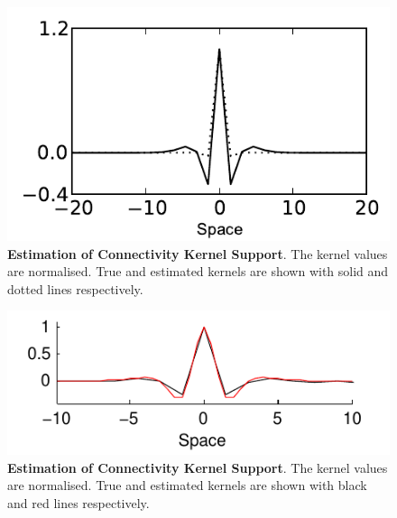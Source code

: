 \documentclass[]{article}
\begin{document}
\begin{figure}[!ht]
\begin{center}
\includegraphics{./Figures/KernelWidthEstimation.pdf}
\end{center}
\caption{{\bf Estimation of Connectivity Kernel Support}. The kernel values are normalised. True  and estimated kernels are shown with solid and dotted lines respectively.}
\label{fig:KernelWidth}
\end{figure}

\begin{figure}[!ht]
\begin{center}
\includegraphics{./Figures/KernelWidthEstimation2.pdf}
\end{center}
\caption{{\bf Estimation of Connectivity Kernel Support}. The kernel values are normalised. True  and estimated kernels are shown with black and red lines respectively.}
\label{fig:KernelWidth2}
\end{figure}
\end{document}
